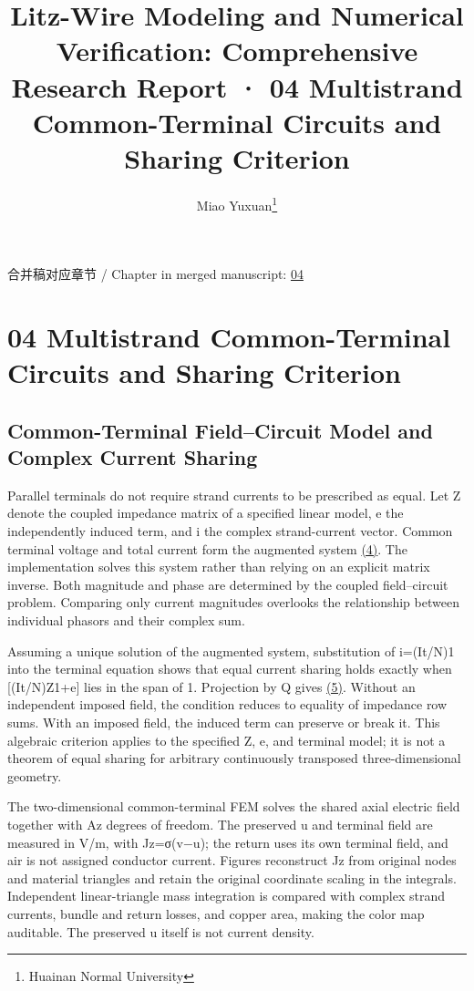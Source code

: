 \documentclass[journal,10pt]{IEEEtran}
\begin{document}
\title{Litz-Wire Modeling and Numerical Verification: Comprehensive Research Report · 04 Multistrand Common-Terminal Circuits and Sharing Criterion}
\author{Miao Yuxuan\thanks{Huainan Normal University}}

\maketitle
\noindent 合并稿对应章节 / Chapter in merged manuscript: \href{report_en_ieee.pdf#chapter-04}{04}\par
\FloatBarrier
\section*{04 Multistrand Common-Terminal Circuits and Sharing Criterion}
\hypertarget{chapter-04}{}
\subsection*{Common-Terminal Field–Circuit Model and Complex Current Sharing}
\hypertarget{04.common.heading}{}
Parallel terminals do not require strand currents to be prescribed as equal. Let Z denote the coupled impedance matrix of a specified linear model, e the independently induced term, and i the complex strand-current vector. Common terminal voltage and total current form the augmented system \href{report_en_ieee.pdf#E04}{(4)}. The implementation solves this system rather than relying on an explicit matrix inverse. Both magnitude and phase are determined by the coupled field–circuit problem. Comparing only current magnitudes overlooks the relationship between individual phasors and their complex sum.


Assuming a unique solution of the augmented system, substitution of i=(It/N)1 into the terminal equation shows that equal current sharing holds exactly when [(It/N)Z1+e] lies in the span of 1. Projection by Q gives \href{report_en_ieee.pdf#E05}{(5)}. Without an independent imposed field, the condition reduces to equality of impedance row sums. With an imposed field, the induced term can preserve or break it. This algebraic criterion applies to the specified Z, e, and terminal model; it is not a theorem of equal sharing for arbitrary continuously transposed three-dimensional geometry.


The two-dimensional common-terminal FEM solves the shared axial electric field together with Az degrees of freedom. The preserved u and terminal field are measured in V/m, with Jz=σ(v−u); the return uses its own terminal field, and air is not assigned conductor current. Figures reconstruct Jz from original nodes and material triangles and retain the original coordinate scaling in the integrals. Independent linear-triangle mass integration is compared with complex strand currents, bundle and return losses, and copper area, making the color map auditable. The preserved u itself is not current density.
\end{document}
